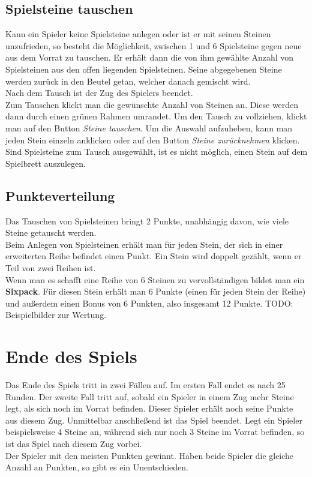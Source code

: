 \documentclass[a4paper, ngerman]{scrartcl}
\begin{document}
\subsection{Spielsteine tauschen}
Kann ein Spieler keine Spielsteine anlegen oder ist er mit seinen Steinen unzufrieden, so besteht die Möglichkeit, zwischen 1 und 6 Spielsteine gegen neue aus dem Vorrat zu tauschen. Er erhält dann die von ihm gewählte Anzahl von Spielsteinen aus den offen liegenden Spielsteinen. Seine abgegebenen Steine werden zurück in den Beutel getan, welcher danach gemischt wird.\\
Nach dem Tausch ist der Zug des Spielers beendet.\\
Zum Tauschen klickt man die gewünschte Anzahl von Steinen an. Diese werden dann durch einen grünen Rahmen umrandet. Um den Tausch zu vollziehen, klickt man auf den Button \emph{Steine tauschen}. Um die Auswahl aufzuheben, kann man jeden Stein einzeln anklicken oder auf den Button \emph{Steine zurücknehmen} klicken. Sind Spielsteine zum Tausch ausgewählt, ist es nicht möglich, einen Stein auf dem Spielbrett auszulegen.
	
\subsection{Punkteverteilung}
Das Tauschen von Spielsteinen bringt 2 Punkte, unabhängig davon, wie viele Steine getauscht werden.\\
Beim Anlegen von Spielsteinen erhält man für jeden Stein, der sich in einer erweiterten Reihe befindet einen Punkt. Ein Stein wird doppelt gezählt, wenn er Teil von zwei Reihen ist.\\
Wenn man es schafft eine Reihe von 6 Steinen zu vervollständigen bildet man ein \textbf{Sixpack}. Für diesen Stein erhält man 6 Punkte (einen für jeden Stein der Reihe) und außerdem einen Bonus von 6 Punkten, also insgesamt 12 Punkte.
TODO: Beispielbilder zur Wertung.
	
\section{Ende des Spiels}
\label{sec:gameOver}
Das Ende des Spiels tritt in zwei Fällen auf. Im ersten Fall endet es nach 25 Runden. Der zweite Fall tritt auf, sobald ein Spieler in einem Zug mehr Steine legt, als sich noch im Vorrat befinden. Dieser Spieler erhält noch seine Punkte aus diesem Zug. Unmittelbar anschließend ist das Spiel beendet. Legt ein Spieler beispielsweise 4 Steine an, während sich nur noch 3 Steine im Vorrat befinden, so ist das Spiel nach diesem Zug vorbei.\\
Der Spieler mit den meisten Punkten gewinnt. Haben beide Spieler die gleiche Anzahl an Punkten, so gibt es ein Unentschieden.
\end{document}
